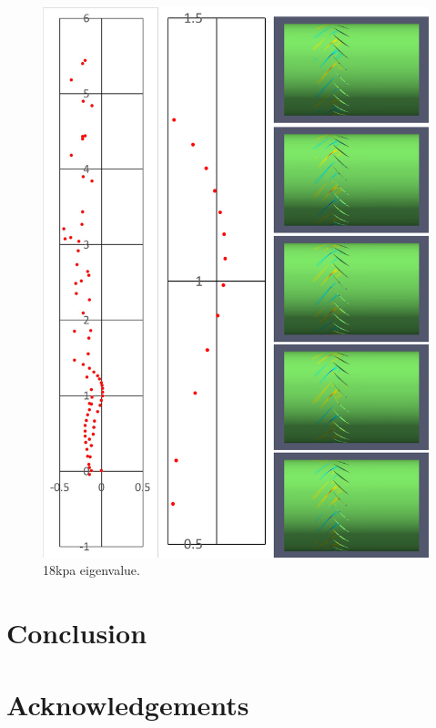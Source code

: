 \documentclass[journal,final]{new-aiaa}
\begin{document}
\begin{figure}[htb]
	\centering   
	\includegraphics[width=\textwidth]{pic/rotor67-modes.png}
	\caption{18kpa eigenvalue.}
	\label{fig:r67-eigen-18kpa}
\end{figure}


\section{Conclusion}
\label{conclusion}

\section*{Acknowledgements}


\end{document}
